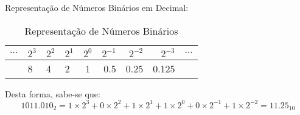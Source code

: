 \documentclass{article}
\begin{document}
                \begin{example}
                    Representação de Números Binários em Decimal:
                        \begin{table}[H]
                            \centering  
                            \begin{tabular}[]{r lll c rrr l}
                                $\dots$ & $2^3$ & $2^2$ & $2^1$ & $2^0$ & $2^{-1}$ & $2^{-2}$ & $2^{-3}$ & $\dots$\\\hline
                                        & 8     & 4     & 2     & 1     & 0.5      & 0.25     & 0.125    & \\
                            \end{tabular}
                            \caption{Representação de Números Binários}
                        \end{table}\noindent
                    Desta forma, sabe-se que:
                        \begin{equation*}
                            \boxed{
                                1011.010_{2} = 
                                1 \times 2^{ 3} + 
                                0 \times 2^{ 2} + 
                                1 \times 2^{ 1} + 
                                1 \times 2^{ 0} + 
                                0 \times 2^{-1} + 
                                1 \times 2^{-2}
                                 = 
                                 11.25_{10}
                            }
                        \end{equation*}
                \end{example}
\end{document}
